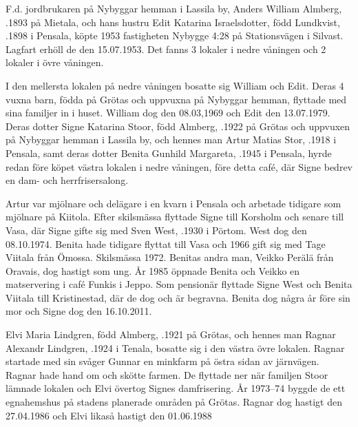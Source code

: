 \jhvspace{}


F.d. jordbrukaren på Nybyggar hemman i Lassila by, Anders William Almberg, .1893 på Mietala, och hans hustru Edit Katarina Israelsdotter, född Lundkvist, .1898 i Pensala, köpte 1953 fastigheten Nybygge 4:28 på Stationsvägen i Silvast. Lagfart erhöll de den 15.07.1953. Det fanns 3 lokaler i nedre våningen och 2 lokaler i övre våningen.

I den mellersta lokalen på nedre våningen bosatte sig William och Edit. Deras 4 vuxna barn, födda på Grötas och uppvuxna på Nybyggar hemman, flyttade med sina familjer in i huset. William dog den 08.03,1969 och Edit den 13.07.1979. Deras dotter Signe Katarina Stoor, född Almberg, .1922 på Grötas och uppvuxen på Nybyggar hemman i Lassila by, och hennes man Artur Matias Stor, .1918 i Pensala, samt deras dotter Benita Gunhild Margareta, .1945 i Pensala, hyrde redan före köpet västra lokalen i nedre våningen, före detta café, där Signe bedrev en dam- och herrfrisersalong.


Artur var mjölnare och delägare i en kvarn i Pensala och arbetade tidigare som mjölnare på Kiitola. Efter skilsmässa flyttade Signe till Korsholm och senare till Vasa, där Signe gifte sig med Sven West, .1930 i Pörtom. West dog den 08.10.1974.  Benita hade tidigare flyttat till Vasa och 1966 gift sig med Tage Viitala från Ömossa.  Skilsmässa 1972. Benitas andra man, Veikko Perälä från Oravais, dog hastigt som ung. År 1985 öppnade Benita och Veikko en matservering i café Funkis i Jeppo. Som pensionär flyttade Signe West och Benita Viitala till Kristinestad, där de dog och är begravna. Benita dog några år före sin mor och Signe dog den 16.10.2011.

Elvi Maria Lindgren, född Almberg, .1921 på Grötas, och hennes man Ragnar Alexandr Lindgren, .1924 i Tenala, bosatte sig i den västra övre lokalen. Ragnar startade med sin svåger Gunnar en minkfarm på östra sidan av järnvägen. Ragnar hade hand om och skötte farmen. De flyttade ner när familjen Stoor lämnade lokalen och Elvi övertog Signes damfrisering. År 1973--74 byggde de ett egnahemshus på stadens planerade områden på Grötas. Ragnar dog hastigt den 27.04.1986 och Elvi likaså hastigt den 01.06.1988

